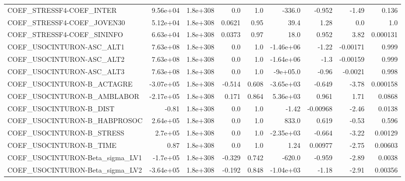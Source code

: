 \begin{tabular}{lrrrrrrrr}
COEF\_STRESSF4-COEF\_INTER          &    9.56e+04 &     1.8e+308 &     0.0 &      1.0 &     -336.0 &      -0.952 &        -1.49 &         0.136 \\
COEF\_STRESSF4-COEF\_JOVEN30        &    5.12e+04 &     1.8e+308 &  0.0621 &     0.95 &       39.4 &        1.28 &          0.0 &           1.0 \\
COEF\_STRESSF4-COEF\_SININFO        &    6.63e+04 &     1.8e+308 &  0.0373 &     0.97 &       18.0 &       0.952 &         3.82 &      0.000131 \\
COEF\_USOCINTURON-ASC\_ALT1         &    7.63e+08 &     1.8e+308 &     0.0 &      1.0 &  -1.46e+06 &       -1.22 &     -0.00171 &         0.999 \\
COEF\_USOCINTURON-ASC\_ALT2         &    7.63e+08 &     1.8e+308 &     0.0 &      1.0 &  -1.64e+06 &        -1.3 &     -0.00159 &         0.999 \\
COEF\_USOCINTURON-ASC\_ALT3         &    7.63e+08 &     1.8e+308 &     0.0 &      1.0 &   -9e+05.0 &       -0.96 &      -0.0021 &         0.998 \\
COEF\_USOCINTURON-B\_ACTAGRE        &   -3.07e+05 &     1.8e+308 &  -0.514 &    0.608 &  -3.65e+03 &      -0.649 &        -3.78 &      0.000158 \\
COEF\_USOCINTURON-B\_AMBLABOR       &   -2.17e+05 &     1.8e+308 &   0.171 &    0.864 &   5.36e+03 &       0.961 &         1.71 &        0.0868 \\
COEF\_USOCINTURON-B\_DIST           &       -0.81 &     1.8e+308 &     0.0 &      1.0 &      -1.42 &    -0.00968 &        -2.46 &        0.0138 \\
COEF\_USOCINTURON-B\_HABPROSOC      &    2.64e+05 &     1.8e+308 &     0.0 &      1.0 &      833.0 &       0.619 &        -0.53 &         0.596 \\
COEF\_USOCINTURON-B\_STRESS         &     2.7e+05 &     1.8e+308 &     0.0 &      1.0 &  -2.35e+03 &      -0.664 &        -3.22 &       0.00129 \\
COEF\_USOCINTURON-B\_TIME           &        0.87 &     1.8e+308 &     0.0 &      1.0 &       1.24 &     0.00977 &        -2.75 &       0.00603 \\
COEF\_USOCINTURON-Beta\_sigma\_LV1   &    -1.7e+05 &     1.8e+308 &  -0.329 &    0.742 &     -620.0 &      -0.959 &        -2.89 &        0.0038 \\
COEF\_USOCINTURON-Beta\_sigma\_LV2   &   -3.64e+05 &     1.8e+308 &  -0.192 &    0.848 &  -1.04e+03 &       -1.18 &        -2.91 &       0.00356 \\

\end{tabular}
